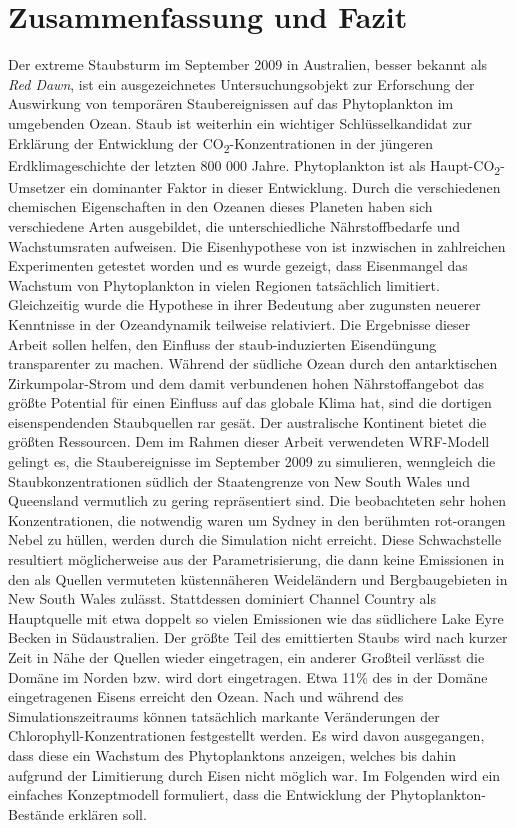 \documentclass[12pt,a4paper,onecolumn,headheight=30pt]{scrartcl}
\newcommand{\cotwo}{CO\textsubscript{2}}
\begin{document}
\section{Zusammenfassung und Fazit} \label{sec:conclusion}
Der extreme Staubsturm im September 2009 in Australien, besser bekannt als \textit{Red Dawn}, ist ein ausgezeichnetes Untersuchungsobjekt zur Erforschung der Auswirkung von temporären Staubereignissen auf das Phytoplankton im umgebenden Ozean. Staub ist weiterhin ein wichtiger Schlüsselkandidat zur Erklärung der Entwicklung der \cotwo -Konzentrationen in der jüngeren Erdklimageschichte der letzten 800 000 Jahre. Phytoplankton ist als Haupt-\cotwo -Umsetzer ein dominanter Faktor in dieser Entwicklung. Durch die verschiedenen chemischen Eigenschaften in den Ozeanen dieses Planeten haben sich verschiedene Arten ausgebildet, die unterschiedliche Nährstoffbedarfe und Wachstumsraten aufweisen. Die Eisenhypothese von \citet{Martin.1990} ist inzwischen in zahlreichen Experimenten \citep{Boyd.2007} getestet worden und es wurde gezeigt, dass Eisenmangel das Wachstum von Phytoplankton in vielen Regionen tatsächlich limitiert. Gleichzeitig wurde die Hypothese in ihrer Bedeutung aber zugunsten neuerer Kenntnisse in der Ozeandynamik \citep{Tagliabue.2017} teilweise relativiert. Die Ergebnisse dieser Arbeit sollen helfen, den Einfluss der staub-induzierten Eisendüngung transparenter zu machen. Während der südliche Ozean durch den antarktischen Zirkumpolar-Strom und dem damit verbundenen hohen Nährstoffangebot das größte Potential für einen Einfluss auf das globale Klima hat, sind die dortigen eisenspendenden Staubquellen rar gesät. Der australische Kontinent bietet die größten Ressourcen. Dem im Rahmen dieser Arbeit verwendeten WRF-Modell gelingt es, die Staubereignisse im September 2009 zu simulieren, wenngleich die Staubkonzentrationen südlich der Staatengrenze von New South Wales und Queensland vermutlich zu gering repräsentiert sind. Die beobachteten sehr hohen Konzentrationen, die notwendig waren um Sydney in den berühmten rot-orangen Nebel zu hüllen, werden durch die Simulation nicht erreicht. Diese Schwachstelle resultiert möglicherweise aus der Parametrisierung, die dann keine Emissionen in den als Quellen vermuteten \citep{Leys.2011} küstennäheren Weideländern und Bergbaugebieten in New South Wales zulässt. Stattdessen dominiert Channel Country als Hauptquelle mit etwa doppelt so vielen Emissionen wie das südlichere Lake Eyre Becken in Südaustralien. Der größte Teil des emittierten Staubs wird nach kurzer Zeit in Nähe der Quellen wieder eingetragen, ein anderer Großteil verlässt die Domäne im Norden bzw. wird dort eingetragen. Etwa 11\% des in der Domäne eingetragenen Eisens erreicht den Ozean. Nach und während des Simulationszeitraums können tatsächlich markante Veränderungen der Chlorophyll-Konzentrationen festgestellt werden. Es wird davon ausgegangen, dass diese ein Wachstum des Phytoplanktons anzeigen, welches bis dahin aufgrund der Limitierung durch Eisen nicht möglich war. Im Folgenden wird ein einfaches Konzeptmodell formuliert, dass die Entwicklung der Phytoplankton-Bestände erklären soll.
\end{document}
